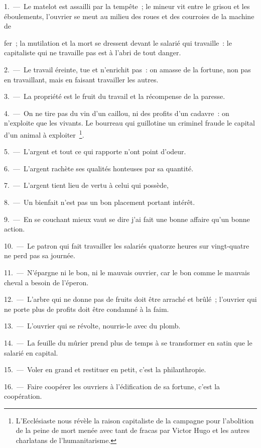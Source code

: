 \documentclass[french,twoside]{book} %
\begin{document}
1. — Le matelot est assailli par la tempête ; le mineur vit entre le grisou et les éboulements, l’ouvrier se meut au milieu des roues et des courroies de la machine de\par
fer ; la mutilation et la mort se dressent devant le salarié qui travaille : le capitaliste qui ne travaille pas est à l’abri de tout danger.\par
2. — Le travail éreinte, tue et n’enrichit pas : on amasse de la fortune, non pas en travaillant, mais en faisant travailler les autres.\par
3. — La propriété est le fruit du travail et la récompense de la paresse.\par
4. — On ne tire pas du vin d’un caillou, ni des profits d’un cadavre : on n’exploite que les vivants. Le bourreau qui guillotine un criminel fraude le capital d’un animal à exploiter \footnote{L'Ecclésiaste nous révèle la raison capitaliste de la campagne pour l’abolition de la peine de mort menée avec tant de fracas par Victor Hugo et les autres charlatans de l’humanitarisme.}.\par
5. — L'argent et tout ce qui rapporte n’ont point d’odeur.\par
6. — L'argent rachète ses qualités honteuses par sa quantité.\par
7. — L'argent tient lieu de vertu à celui qui possède,\par
8. — Un bienfait n’est pas un bon placement portant intérêt.\par
9. — En se couchant mieux vaut se dire j’ai fait une bonne affaire qu’un bonne action.\par
10. — Le patron qui fait travailler les salariés quatorze heures sur vingt-quatre ne perd pas sa journée.\par
11. — N'épargne ni le bon, ni le mauvais ouvrier, car le bon comme le mauvais cheval a besoin de l’éperon.\par
12. — L'arbre qui ne donne pas de fruits doit être arraché et brûlé ; l’ouvrier qui ne porte plus de profits doit être condamné à la faim.\par
13. — L'ouvrier qui se révolte, nourris-le avec du plomb.\par
14. — La feuille du mûrier prend plus de temps à se transformer en satin que le salarié en capital.\par
15. — Voler en grand et restituer en petit, c’est la philanthropie.\par
16. — Faire coopérer les ouvriers à l’édification de sa fortune, c’est la coopération.\par
\end{document}
